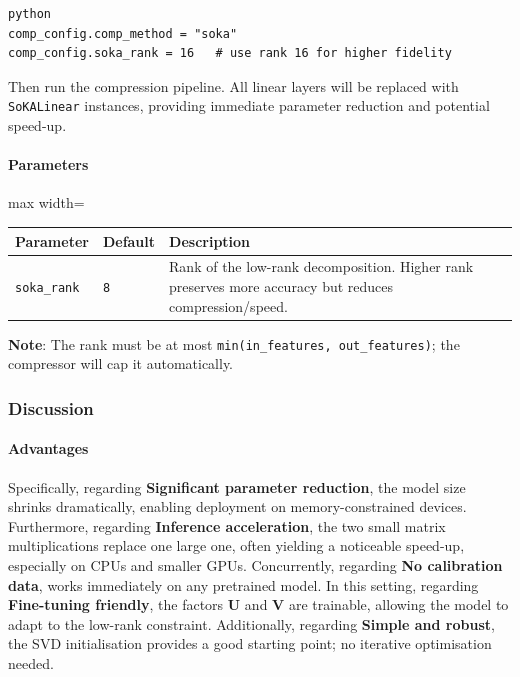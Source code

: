 \vspace{0.5em}
\begin{mdframed}[backgroundcolor=codebg, linecolor=codeframe, linewidth=1pt, roundcorner=4pt, innerleftmargin=2pt, innerrightmargin=5pt, innertopmargin=5pt, innerbottommargin=5pt]
\begin{lstlisting}
python
comp_config.comp_method = "soka"
comp_config.soka_rank = 16   # use rank 16 for higher fidelity
\end{lstlisting}
\end{mdframed}
\vspace{0.5em}

Then run the compression pipeline. All linear layers will be replaced with \texttt{SoKALinear} instances, providing immediate parameter reduction and potential speed-up.

\paragraph{Parameters}

\begin{center}
\begin{adjustbox}{max width=\columnwidth}
\renewcommand{\arraystretch}{1.2}
\begin{tabular}{lll}
\toprule
Parameter & Default & Description \\
\midrule
\texttt{soka\_rank} & \texttt{8} & Rank of the low-rank decomposition. Higher rank preserves more accuracy but reduces compression/speed. \\

\bottomrule
\end{tabular}
\end{adjustbox}
\end{center}
\textbf{Note}: The rank must be at most \texttt{min(in\_features, out\_features)}; the compressor will cap it automatically.


\subsubsection*{Discussion}

\paragraph{Advantages}

Specifically, regarding \textbf{Significant parameter reduction}, the model size shrinks dramatically, enabling deployment on memory-constrained devices. Furthermore, regarding \textbf{Inference acceleration}, the two small matrix multiplications replace one large one, often yielding a noticeable speed-up, especially on CPUs and smaller GPUs. Concurrently, regarding \textbf{No calibration data}, works immediately on any pretrained model. In this setting, regarding \textbf{Fine-tuning friendly}, the factors \textbf{U} and \textbf{V} are trainable, allowing the model to adapt to the low-rank constraint. Additionally, regarding \textbf{Simple and robust}, the SVD initialisation provides a good starting point; no iterative optimisation needed.


